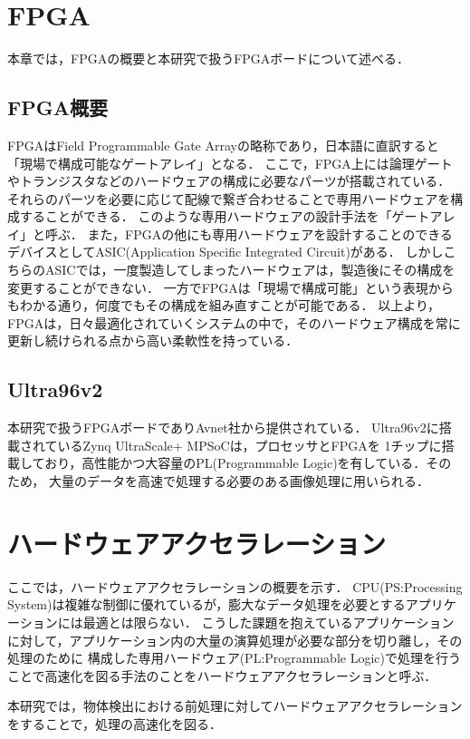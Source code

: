 \documentclass[11pt,a4j]{jreport}
\begin{document}
\section{FPGA}
本章では，FPGA\cite{fpga}の概要と本研究で扱うFPGAボードについて述べる．
\subsection{FPGA概要}
FPGAはField Programmable Gate Arrayの略称であり，日本語に直訳すると「現場で構成可能なゲートアレイ」となる．
ここで，FPGA上には論理ゲートやトランジスタなどのハードウェアの構成に必要なパーツが搭載されている．
それらのパーツを必要に応じて配線で繋ぎ合わせることで専用ハードウェアを構成することができる．
このような専用ハードウェアの設計手法を「ゲートアレイ」と呼ぶ．
また，FPGAの他にも専用ハードウェアを設計することのできるデバイスとしてASIC(Application Specific Integrated Circuit)がある．
しかしこちらのASICでは，一度製造してしまったハードウェアは，製造後にその構成を変更することができない．
一方でFPGAは「現場で構成可能」という表現からもわかる通り，何度でもその構成を組み直すことが可能である．
以上より，FPGAは，日々最適化されていくシステムの中で，そのハードウェア構成を常に更新し続けられる点から高い柔軟性を持っている．

\subsection{Ultra96v2}
本研究で扱うFPGAボードでありAvnet社から提供されている．
Ultra96v2に搭載されているZynq UltraScale+ MPSoC\cite{boardinfo}は，プロセッサとFPGAを
1チップに搭載しており，高性能かつ大容量のPL(Programmable Logic)を有している．そのため，
大量のデータを高速で処理する必要のある画像処理に用いられる．

\section{ハードウェアアクセラレーション}
ここでは，ハードウェアアクセラレーション\cite{HWAccel}の概要を示す．
CPU(PS:Processing System)は複雑な制御に優れているが，膨大なデータ処理を必要とするアプリケーションには最適とは限らない．
こうした課題を抱えているアプリケーションに対して，アプリケーション内の大量の演算処理が必要な部分を切り離し，その処理のために
構成した専用ハードウェア(PL:Programmable Logic)で処理を行うことで高速化を図る手法のことをハードウェアアクセラレーションと呼ぶ．

本研究では，物体検出における前処理に対してハードウェアアクセラレーションをすることで，処理の高速化を図る．
%
\end{document}
